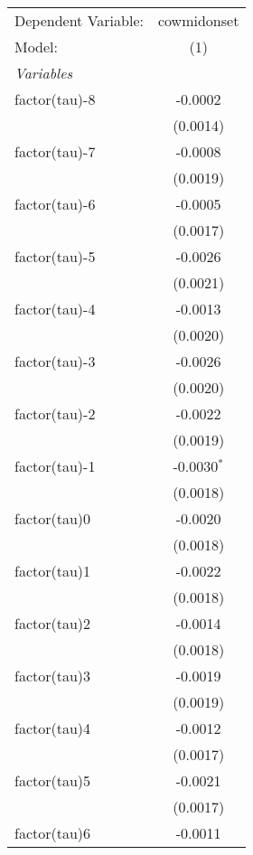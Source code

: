 \begingroup
\centering
\begin{tabular}{lc}
   \tabularnewline \midrule \midrule
   Dependent Variable: & cowmidonset\\  
   Model:              & (1)\\  
   \midrule
   \emph{Variables}\\
   factor(tau)-8       & -0.0002\\   
                       & (0.0014)\\   
   factor(tau)-7       & -0.0008\\   
                       & (0.0019)\\   
   factor(tau)-6       & -0.0005\\   
                       & (0.0017)\\   
   factor(tau)-5       & -0.0026\\   
                       & (0.0021)\\   
   factor(tau)-4       & -0.0013\\   
                       & (0.0020)\\   
   factor(tau)-3       & -0.0026\\   
                       & (0.0020)\\   
   factor(tau)-2       & -0.0022\\   
                       & (0.0019)\\   
   factor(tau)-1       & -0.0030$^{*}$\\   
                       & (0.0018)\\   
   factor(tau)0        & -0.0020\\   
                       & (0.0018)\\   
   factor(tau)1        & -0.0022\\   
                       & (0.0018)\\   
   factor(tau)2        & -0.0014\\   
                       & (0.0018)\\   
   factor(tau)3        & -0.0019\\   
                       & (0.0019)\\   
   factor(tau)4        & -0.0012\\   
                       & (0.0017)\\   
   factor(tau)5        & -0.0021\\   
                       & (0.0017)\\   
   factor(tau)6        & -0.0011\\   

\end{tabular}
